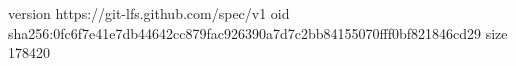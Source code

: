 version https://git-lfs.github.com/spec/v1
oid sha256:0fc6f7e41e7db44642cc879fac926390a7d7c2bb84155070fff0bf821846cd29
size 178420
